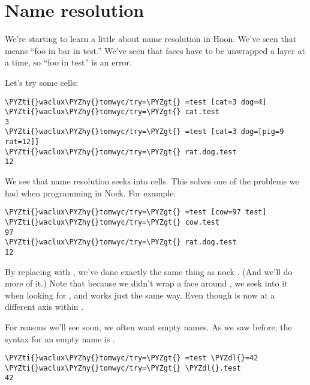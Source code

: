 \section{Name resolution}

We're starting to learn a little about name resolution in Hoon.
We've seen that  means ``foo in bar in test.''  We've
seen that faces have to be unwrapped a layer at a time, so ``foo in
test'' is an error.

Let's try some cells:

\begin{framed_shaded}
\begin{Verbatim}[fontsize=\relsize{-2.5},fontseries=b,commandchars=\\\{\}]
\PYZti{}waclux\PYZhy{}tomwyc/try=\PYZgt{} =test [cat=3 dog=4]
\PYZti{}waclux\PYZhy{}tomwyc/try=\PYZgt{} cat.test
3
\PYZti{}waclux\PYZhy{}tomwyc/try=\PYZgt{} =test [cat=3 dog=[pig=9 rat=12]]
\PYZti{}waclux\PYZhy{}tomwyc/try=\PYZgt{} rat.dog.test
12
\end{Verbatim}
\end{framed_shaded}

We see that name resolution seeks into cells.  This solves one of
the problems we had when programming in Nock.  For example:

\begin{framed_shaded}
\begin{Verbatim}[fontsize=\relsize{-2.5},fontseries=b,commandchars=\\\{\}]
\PYZti{}waclux\PYZhy{}tomwyc/try=\PYZgt{} =test [cow=97 test]
\PYZti{}waclux\PYZhy{}tomwyc/try=\PYZgt{} cow.test
97
\PYZti{}waclux\PYZhy{}tomwyc/try=\PYZgt{} rat.dog.test
12
\end{Verbatim}
\end{framed_shaded}

By replacing  with \kode{[cow=97 test]}, we've done exactly the
same thing as nock .  (And we'll do more of it.)  Note that
because we didn't wrap a face around , we seek into it when
looking for , and  works just the same way.
Even though  is now at a different axis within .

For reasons we'll see soon, we often want empty names.  As we saw
before, the syntax for an empty name is \kode{\$}.

\begin{framed_shaded}
\begin{Verbatim}[fontsize=\relsize{-2.5},fontseries=b,commandchars=\\\{\}]
\PYZti{}waclux\PYZhy{}tomwyc/try=\PYZgt{} =test \PYZdl{}=42
\PYZti{}waclux\PYZhy{}tomwyc/try=\PYZgt{} \PYZdl{}.test
42
\end{Verbatim}
\end{framed_shaded}

